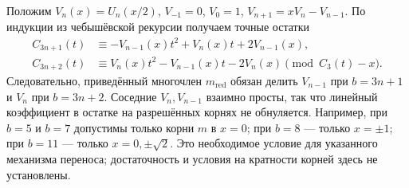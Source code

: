 Положим $V_n(x)=U_n(x/2)$, $V_{-1}=0$, $V_0=1$,
$V_{n+1}=xV_n-V_{n-1}$. По индукции из чебышёвской рекурсии
получаем точные остатки
\[
\begin{aligned}
 C_{3n+1}(t)&\equiv -V_{n-1}(x)t^2+V_n(x)t+2V_{n-1}(x),\\
 C_{3n+2}(t)&\equiv V_n(x)t^2-V_{n-1}(x)t-2V_n(x)
 \pmod{C_3(t)-x}.
\end{aligned}
\]
Следовательно, приведённый многочлен $m_{\mathrm{red}}$ обязан делить
$V_{n-1}$ при $b=3n+1$ и $V_n$ при $b=3n+2$.
Соседние $V_n,V_{n-1}$ взаимно просты, так что линейный коэффициент
в остатке на разрешённых корнях не обнуляется.
Например, при $b=5$ и $b=7$ допустимы только корни $m$ в $x=0$;
при $b=8$ --- только $x=\pm1$; при $b=11$ --- только
$x=0,\pm\sqrt2$.
Это необходимое условие для указанного механизма переноса;
достаточность и условия на кратности корней здесь не установлены.
